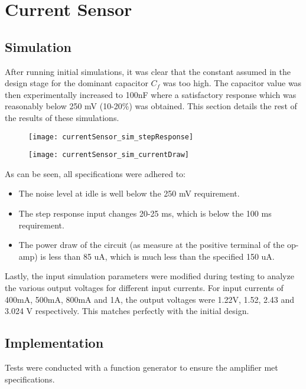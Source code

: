 \graphicspath{{content/3_results/figures}}
\section{Current Sensor}

\subsection{Simulation}

After running initial simulations, it was clear that the constant assumed in the design stage for the dominant capacitor $C_f$ was too high. The capacitor value was then experimentally
increased to 100nF where a satisfactory response which was reasonably below 250 mV (10-20\%) was obtained. This section details the rest of the results of these simulations.

\begin{figure}[h!]
   \centering
   \texttt{[image: currentSensor\_sim\_stepResponse]}
   \label{fig:simulation response}
\end{figure}

\begin{figure}[h!]
   \centering
   \texttt{[image: currentSensor\_sim\_currentDraw]}
   \label{fig:simulation_current}
\end{figure}

As can be seen, all specifications were adhered to:
\begin{itemize}
   \item The noise level at idle is well below the 250 mV requirement.
   \item The step response input changes 20-25 ms, which is below the 100 ms requirement.
   \item The power draw of the circuit (as measure at the positive terminal of the op-amp) is less than 85 uA, which is much less than the specified 150 uA.
\end{itemize}

Lastly, the input simulation parameters were modified during testing to analyze the various output voltages for different input currents. For input currents of 400mA, 500mA, 800mA and 1A,
the output voltages were 1.22V, 1.52, 2.43 and 3.024 V respectively. This matches perfectly with the initial design.

\subsection{Implementation}
Tests were conducted with a function generator to ensure the amplifier met specifications.

